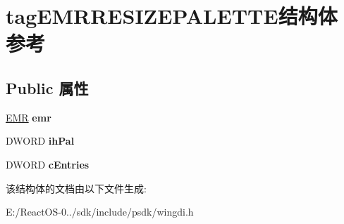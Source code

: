 \hypertarget{structtag_e_m_r_r_e_s_i_z_e_p_a_l_e_t_t_e}{}\section{tag\+E\+M\+R\+R\+E\+S\+I\+Z\+E\+P\+A\+L\+E\+T\+T\+E结构体 参考}
\label{structtag_e_m_r_r_e_s_i_z_e_p_a_l_e_t_t_e}
\subsection*{Public 属性}
\begin{DoxyCompactItemize}
\item 
\mbox{\label{structtag_e_m_r_r_e_s_i_z_e_p_a_l_e_t_t_e_a633fa2861836e7fd09cf07360b9a6f3b}} 
\hyperlink{structtag_e_m_r}{E\+MR} {\bfseries emr}
\item 
\mbox{\label{structtag_e_m_r_r_e_s_i_z_e_p_a_l_e_t_t_e_a1783f84959a81878527afd7ee5dd7781}} 
D\+W\+O\+RD {\bfseries ih\+Pal}
\item 
\mbox{\label{structtag_e_m_r_r_e_s_i_z_e_p_a_l_e_t_t_e_a30b54c288260ca91490f09febbff2326}} 
D\+W\+O\+RD {\bfseries c\+Entries}
\end{DoxyCompactItemize}


该结构体的文档由以下文件生成\+:\begin{DoxyCompactItemize}
\item 
E\+:/\+React\+O\+S-\/0../sdk/include/psdk/wingdi.\+h\end{DoxyCompactItemize}
